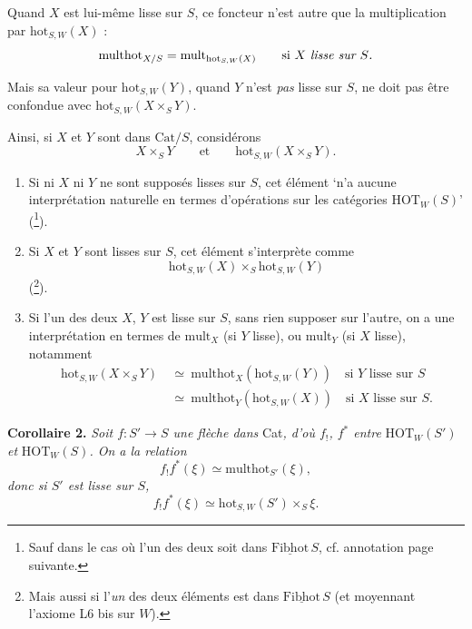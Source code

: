 \documentclass[11pt]{article}
\newcommand{\msp}[1]{\marginpar{\footnotesize [#1]}}
\newcommand{\hot}{\mathrm{hot}}
\newcommand{\HOT}{\mathrm{HOT}}
\newcommand{\Cat}{\mathrm{Cat}}
\newcommand{\multhot}{\mathrm{multhot}}
\newcommand{\mult}{\mathrm{mult}}
\begin{document}
Quand $X$ est lui-même lisse sur $S$, ce foncteur n'est autre que la multiplication par $\hot_{S,W}(X)$ :
\[\multhot_{X/S}=\mult_{\hot_{S,W}(X)}\qquad\text{si $X$ \textit{lisse sur $S$.}}\]

Mais sa valeur pour $\hot_{S,W}(Y)$, quand $Y$ n'est \textit{pas} lisse sur $S$, ne doit pas être confondue avec $\hot_{S,W}(X\times_S Y)$.

Ainsi, si $X$ et $Y$ sont dans $\Cat/S$, considérons
\[X\times_S Y\qquad\text{et}\qquad\boxed{\hot_{S,W}(X\times_S Y).}\] %

\begin{enumerate}
\item[a)] Si ni $X$ ni $Y$ ne sont supposés lisses sur $S$, cet élément ‘n'a aucune interprétation naturelle en termes d'opérations sur les catégories $\HOT_W(S)$’ (\footnote[74]{Sauf dans le cas où l'un des deux soit dans $\underline{\mathrm{Fibhot}}\,S$, cf. annotation page suivante.}).

\msp{156}

\item[b)] Si $X$ et $Y$ sont lisses sur $S$, cet élément s'interprète comme
\[\hot_{S,W}(X)\times_S\hot_{S,W}(Y)\]
(\footnote[75]{Mais aussi si l'\textit{un} des deux éléments est dans $\underline{\mathrm{Fibhot}}\,S$ (et moyennant l'axiome L6 bis sur $W$).}).

\item[c)] Si l'un des deux $X$, $Y$ est lisse sur $S$, sans rien supposer sur l'autre, on a une interprétation en termes de $\mult_X$ (si $Y$ lisse), ou $\mult_Y$ (si $X$ lisse), notamment
\[\begin{aligned}
\hot_{S,W}(X\times_S Y)\ &\simeq\ \multhot_X(\hot_{S,W}(Y))\quad\text{si $Y$ lisse sur $S$}\\
&\simeq\ \multhot_Y(\hot_{S,W}(X))\quad\text{si $X$ lisse sur $S$.}
\end{aligned}\]
\end{enumerate}

\textbf{Corollaire 2.} \textit{Soit $f : S'\longrightarrow S$ une flèche dans} Cat\textit{, d'où $f_!$, $f^*$ entre} $\HOT_W(S')$ \textit{et} $\HOT_W(S)$\textit{. On a la relation}
\[f_!f^*(\xi)\simeq\multhot_{S'}(\xi),\]
\textit{donc si $S'$ est lisse sur $S$,}
\[f_!f^*(\xi)\simeq\hot_{S,W}(S')\times_S\xi.\]
\end{document}

